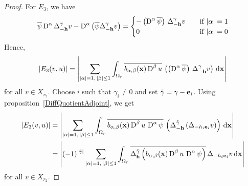 \begin{proof}
For $E_3$, we have
\[
\overline{\psi} \operatorname{D}^\alpha \Delta_{-\mathbf{h}}^\gamma v -
\operatorname{D}^\alpha \left( \overline{\psi} \Delta_{-\mathbf{h}}^\gamma v \right)
= \begin{cases}
- \left( \operatorname{D}^\alpha \overline{\psi} \right) \,
\Delta_{-\mathbf{h}}^\gamma v & \quad \text{if} \ |\alpha|=1 \\
0 & \quad \text{if} \ |\alpha| = 0
\end{cases}
\]
Hence,
\[
\left| E_3(v,u) \right| = \left| \sum_{|\alpha|=1,\,|\beta|\leq 1}
\int_{\Omega_r} \overline{b_{\alpha,\beta}(\mathbf{x}) \operatorname{D}^\beta u} \,
\left( \left( \operatorname{D}^\alpha \overline{\psi} \right) \, \Delta_{-\mathbf{h}}^\gamma v
\right) \,\mathrm{d}{\mathbf{x}} \right|
\]
for all $v \in X_{r_2}$.  Choose $i$ such that $\gamma_i \neq 0$ and set
$\tilde{\gamma} = \gamma - \mathbf{e}_i$.  Using
proposition~\ref{DiffQuotientAdjoint}, we get
\begin{align*}
\left| E_3(v,u) \right|
&= \left| \sum_{|\alpha|=1,\,|\beta|\leq 1}
\int_{\Omega_r} \overline{b_{\alpha,\beta}(\mathbf{x}) \operatorname{D}^\beta u \,
\operatorname{D}^\alpha \psi} \, \left(\Delta^{\tilde{\gamma}}_{-\mathbf{h}}
\left(\Delta_{-h_i \mathbf{e}_i} v \right) \right) \,\mathrm{d}{\mathbf{x}} \right| \\
&= \left| (-1)^{|\tilde{\gamma}|} \sum_{|\alpha|= 1,\,|\beta|\leq 1}
\int_{\Omega_r} \overline{ \Delta_{\mathbf{h}}^{\tilde{\gamma}} \left(
b_{\alpha,\beta}(\mathbf{x}) \operatorname{D}^\beta u \, \operatorname{D}^\alpha \psi \right)} \,
\Delta_{-h_i\mathbf{e}_i} v \,\mathrm{d}{\mathbf{x}} \right|
\end{align*}
for all $v \in X_{r_2}$.


\end{proof}
